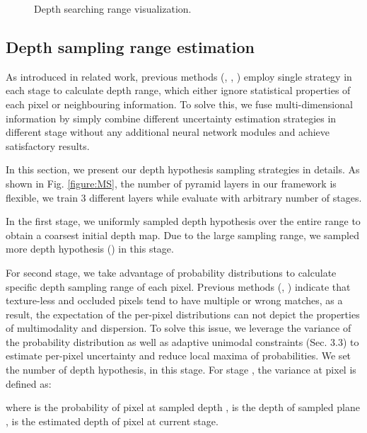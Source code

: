 \documentclass{article}
\begin{document}
\begin{figure}[htb]
\centering
{}
\hfill
{}
\caption{Depth searching range visualization.}
\label{figure:multi-strategies}
\end{figure}

\subsection{Depth sampling range estimation}
As introduced in related work, previous methods (\cite{yang2020cost}, \cite{shen2021cfnet}, \cite{yu2021attention}) employ single strategy in each stage to calculate depth range, which either ignore statistical properties of each pixel or neighbouring information.
To solve this, we fuse multi-dimensional information by simply combine different uncertainty estimation strategies in different stage without any additional neural network modules and achieve satisfactory results.

In this section, we present our depth hypothesis sampling strategies in details.
As shown in Fig. \ref{figure:MS}, the number of pyramid layers in our framework is flexible, we train 3 different layers while evaluate with arbitrary number of stages.

In the first stage, we uniformly sampled depth hypothesis over the entire range to obtain a coarsest initial depth map.
Due to the large sampling range, we sampled more depth hypothesis () in this stage.

For second stage, we take advantage of probability distributions to calculate specific depth sampling range of each pixel.
Previous methods (\cite{zhang2020adaptive}, \cite{shen2021cfnet}) indicate that texture-less and occluded pixels tend to have multiple or wrong matches, as a result, the expectation of the per-pixel distributions can not depict the properties of multimodality and dispersion.
To solve this issue, we leverage the variance of the probability distribution as well as adaptive unimodal constraints (Sec. 3.3) to estimate per-pixel uncertainty and reduce local maxima of probabilities.
We set the number of depth hypothesis,  in this stage.
For stage , the variance at pixel  is defined as:

where  is the probability of pixel  at sampled depth , is the depth of sampled plane ,  is the estimated depth of pixel  at current stage.
\end{document}
